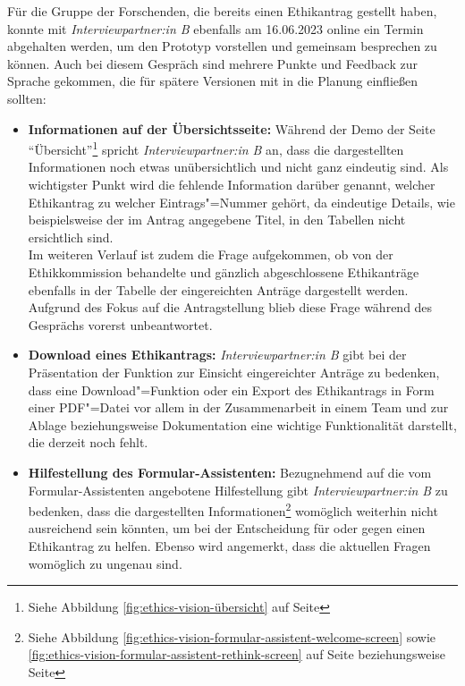 \documentclass[a4paper,12pt,twoside,numbers=noendperiod]{scrreprt}
\begin{document}
Für die Gruppe der Forschenden, die bereits einen Ethikantrag gestellt haben, konnte mit \textit{Interviewpartner:in B} ebenfalls am 16.06.2023 online ein Termin abgehalten werden, um den Prototyp vorstellen und gemeinsam besprechen zu können. Auch bei diesem Gespräch sind mehrere Punkte und Feedback zur Sprache gekommen, die für spätere Versionen mit in die Planung einfließen sollten:
\begin{itemize}
    \item \textbf{Informationen auf der Übersichtsseite:} Während der Demo der Seite \enquote{Übersicht}\footnote{Siehe Abbildung \ref{fig:ethics-vision-übersicht} auf Seite \pageref{fig:ethics-vision-übersicht}} spricht \textit{Interviewpartner:in B} an, dass die dargestellten Informationen noch etwas unübersichtlich und nicht ganz eindeutig sind. Als wichtigster Punkt wird die fehlende Information darüber genannt, welcher Ethikantrag zu welcher Eintrags"=Nummer gehört, da eindeutige Details, wie beispielsweise der im Antrag angegebene Titel, in den Tabellen nicht ersichtlich sind.\\
    Im weiteren Verlauf ist zudem die Frage aufgekommen, ob von der Ethikkommission behandelte und gänzlich abgeschlossene Ethikanträge ebenfalls in der Tabelle der eingereichten Anträge dargestellt werden. Aufgrund des Fokus auf die Antragstellung blieb diese Frage während des Gesprächs vorerst unbeantwortet.
    \item \textbf{Download eines Ethikantrags:} \textit{Interviewpartner:in B} gibt bei der Präsentation der Funktion zur Einsicht eingereichter Anträge zu bedenken, dass eine Download"=Funktion oder ein Export des Ethikantrags in Form einer PDF"=Datei vor allem in der Zusammenarbeit in einem Team und zur Ablage beziehungsweise Dokumentation eine wichtige Funktionalität darstellt, die derzeit noch fehlt. 
    \item \textbf{Hilfestellung des Formular-Assistenten:} Bezugnehmend auf die vom Formular-Assistenten angebotene Hilfestellung gibt \textit{Interviewpartner:in B} zu bedenken, dass die dargestellten Informationen\footnote{Siehe Abbildung \ref{fig:ethics-vision-formular-assistent-welcome-screen} sowie \ref{fig:ethics-vision-formular-assistent-rethink-screen} auf Seite \pageref{fig:ethics-vision-formular-assistent-welcome-screen} beziehungsweise Seite \pageref{fig:ethics-vision-formular-assistent-rethink-screen}} womöglich weiterhin nicht ausreichend sein könnten, um bei der Entscheidung für oder gegen einen Ethikantrag zu helfen. Ebenso wird angemerkt, dass die aktuellen Fragen womöglich zu ungenau sind.
\end{itemize}
\end{document}
